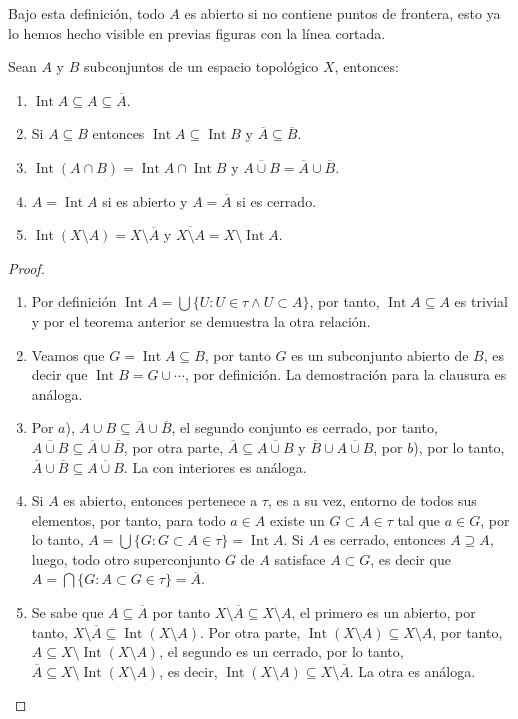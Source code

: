 \documentclass[11pt,oneside,a4paper]{book}
\DeclareMathOperator{\Int}{Int}
\begin{document}
Bajo esta definición, todo $A$ es abierto si no contiene puntos de frontera, esto ya lo hemos hecho visible en previas figuras con la línea cortada.
\begin{thm}
Sean $A$ y $B$ subconjuntos de un espacio topológico $X$, entonces:
\begin{enumerate}[$a$)]
\item $\Int A\subseteq A\subseteq\overline{A}$.
\item Si $A\subseteq B$ entonces $\Int A\subseteq\Int B$ y $\overline{A}\subseteq\overline{B}$.
\item $\Int(A\cap B)=\Int A\cap\Int B$ y $\overline{A\cup B}=\overline{A}\cup\overline{B}$.
\item $A=\Int A$ si es abierto y $A=\overline{A}$ si es cerrado.
\item $\Int(X\setminus A)=X\setminus\overline{A}$ y $\overline{X\setminus A}=X\setminus\Int A$.
\end{enumerate}
\end{thm}
\begin{proof}
\begin{enumerate}[$a$)]
\item Por definición $\Int A=\bigcup\{U:U\in\tau\wedge U\subset A\}$, por tanto, $\Int A\subseteq A$ es trivial y por el teorema anterior se demuestra la otra relación.
\item Veamos que $G=\Int A\subseteq B$, por tanto $G$ es un subconjunto abierto de $B$, es decir que $\Int B=G\cup\cdots$, por definición. La demostración para la clausura es análoga.
\item Por $a$), $A\cup B\subseteq\overline{A}\cup\overline{B}$, el segundo conjunto es cerrado, por tanto, $\overline{A\cup B}\subseteq\overline{A}\cup\overline{B}$, por otra parte, $\overline{A}\subseteq\overline{A\cup B}$ y $\overline{B}\cup\overline{A\cup B}$, por $b$), por lo tanto, $\overline{A}\cup\overline{B}\subseteq\overline{A\cup B}$. La con interiores es análoga.
\item Si $A$ es abierto, entonces pertenece a $\tau$, es a su vez, entorno de todos sus elementos, por tanto, para todo $a\in A$ existe un $G\subset A\in\tau$ tal que $a\in G$, por lo tanto, $A=\bigcup\{G:G\subset A\in\tau\}=\Int A$. Si $A$ es cerrado, entonces $A\supseteq A$, luego, todo otro superconjunto $G$ de $A$ satisface $A\subset G$, es decir que $A=\bigcap\{G:A\subset G\in\tau\}=\overline{A}$.
\item Se sabe que $A\subseteq\overline{A}$ por tanto $X\setminus\overline{A}\subseteq X\setminus A$, el primero es un abierto, por tanto, $X\setminus\overline{A}\subseteq\Int(X\setminus A)$. Por otra parte, $\Int(X\setminus A)\subseteq X\setminus A$, por tanto, $A\subseteq X\setminus\Int(X\setminus A)$, el segundo es un cerrado, por lo tanto, $\overline{A}\subseteq X\setminus\Int(X\setminus A)$, es decir, $\Int(X\setminus A)\subseteq X\setminus\overline{A}$. La otra es análoga.
\end{enumerate}
\end{proof}
\end{document}

